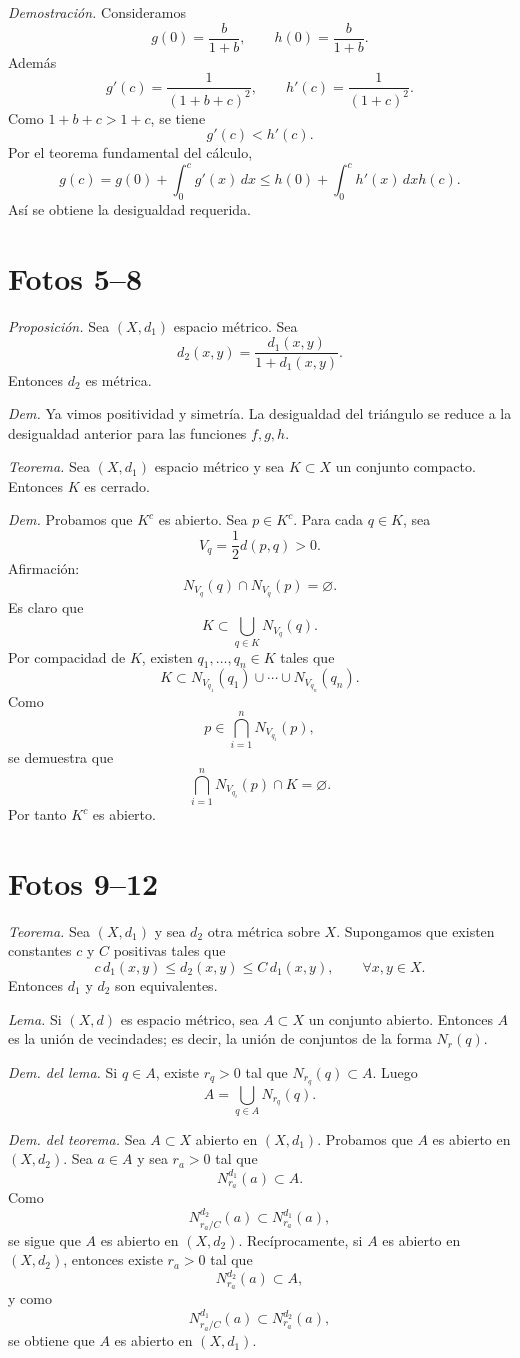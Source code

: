 \documentclass[12pt]{article}
\begin{document}
\textit{Demostración.} Consideramos
\[
g(0)=\frac b{1+b},\qquad h(0)=\frac b{1+b}.
\]
Además
\[
g'(c)=\frac1{(1+b+c)^2},\qquad h'(c)=\frac1{(1+c)^2}.
\]
Como $1+b+c>1+c$, se tiene
\[
g'(c)<h'(c).
\]
Por el teorema fundamental del cálculo,
\[
g(c)=g(0)+\int_0^c g'(x)\,dx
\le h(0)+\int_0^c h'(x)\,dx
h(c).
\]
Así se obtiene la desigualdad requerida.

\section*{Fotos 5--8}

\textit{Proposición.} Sea $(X,d_1)$ espacio métrico. Sea
\[
d_2(x,y)=\frac{d_1(x,y)}{1+d_1(x,y)}.
\]
Entonces $d_2$ es métrica.

\textit{Dem.} Ya vimos positividad y simetría. La desigualdad del triángulo se reduce a la desigualdad anterior para las funciones $f,g,h$.

\textit{Teorema.} Sea $(X,d_1)$ espacio métrico y sea $K\subset X$ un conjunto compacto. Entonces $K$ es cerrado.

\textit{Dem.} Probamos que $K^c$ es abierto.
Sea $p\in K^c$.
Para cada $q\in K$, sea
\[
V_q=\frac12 d(p,q)>0.
\]
Afirmación:
\[
N_{V_q}(q)\cap N_{V_q}(p)=\varnothing.
\]
Es claro que
\[
K\subset \bigcup_{q\in K}N_{V_q}(q).
\]
Por compacidad de $K$, existen $q_1,\dots,q_n\in K$ tales que
\[
K\subset N_{V_{q_1}}(q_1)\cup\cdots\cup N_{V_{q_n}}(q_n).
\]
Como
\[
p\in\bigcap_{i=1}^n N_{V_{q_i}}(p),
\]
se demuestra que
\[
\bigcap_{i=1}^n N_{V_{q_i}}(p)\cap K=\varnothing.
\]
Por tanto $K^c$ es abierto.

\section*{Fotos 9--12}

\textit{Teorema.} Sea $(X,d_1)$ y sea $d_2$ otra métrica sobre $X$.
Supongamos que existen constantes $c$ y $C$ positivas tales que
\[
c\,d_1(x,y)\le d_2(x,y)\le C\,d_1(x,y),\qquad \forall x,y\in X.
\]
Entonces $d_1$ y $d_2$ son equivalentes.

\textit{Lema.} Si $(X,d)$ es espacio métrico, sea $A\subset X$ un conjunto abierto. Entonces $A$ es la unión de vecindades; es decir, la unión de conjuntos de la forma $N_r(q)$.

\textit{Dem. del lema.} Si $q\in A$, existe $r_q>0$ tal que $N_{r_q}(q)\subset A$.
Luego
\[
A=\bigcup_{q\in A}N_{r_q}(q).
\]

\textit{Dem. del teorema.} Sea $A\subset X$ abierto en $(X,d_1)$. Probamos que $A$ es abierto en $(X,d_2)$.
Sea $a\in A$ y sea $r_a>0$ tal que
\[
N_{r_a}^{d_1}(a)\subset A.
\]
Como
\[
N_{r_a/C}^{d_2}(a)\subset N_{r_a}^{d_1}(a),
\]
se sigue que $A$ es abierto en $(X,d_2)$.
Recíprocamente, si $A$ es abierto en $(X,d_2)$, entonces existe $r_a>0$ tal que
\[
N_{r_a}^{d_2}(a)\subset A,
\]
y como
\[
N_{r_a/C}^{d_1}(a)\subset N_{r_a}^{d_2}(a),
\]
se obtiene que $A$ es abierto en $(X,d_1)$.
\end{document}
